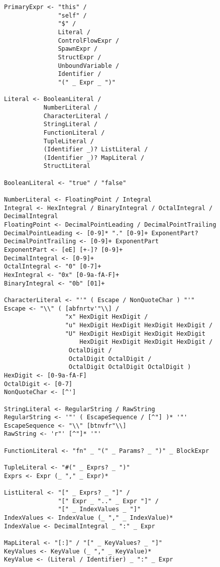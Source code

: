 \begin{verbatim}
PrimaryExpr <- "this" /
               "self" /
               "$" /
               Literal /
               ControlFlowExpr /
               SpawnExpr /
               StructExpr /
               UnboundVariable /
               Identifier /
               "(" _ Expr _ ")"

Literal <- BooleanLiteral /
           NumberLiteral /
           CharacterLiteral /
           StringLiteral /
           FunctionLiteral /
           TupleLiteral /
           (Identifier _)? ListLiteral /
           (Identifier _)? MapLiteral /
           StructLiteral

BooleanLiteral <- "true" / "false"

NumberLiteral <- FloatingPoint / Integral
Integral <- HexIntegral / BinaryIntegral / OctalIntegral / DecimalIntegral
FloatingPoint <- DecimalPointLeading / DecimalPointTrailing
DecimalPointLeading <- [0-9]* "." [0-9]+ ExponentPart?
DecimalPointTrailing <- [0-9]+ ExponentPart
ExponentPart <- [eE] [+-]? [0-9]+
DecimalIntegral <- [0-9]+
OctalIntegral <- "0" [0-7]+
HexIntegral <- "0x" [0-9a-fA-F]+
BinaryIntegral <- "0b" [01]+

CharacterLiteral <- "'" ( Escape / NonQuoteChar ) "'"
Escape <- "\\" ( [abfnrtv'"\\] /
                 "x" HexDigit HexDigit /
                 "u" HexDigit HexDigit HexDigit HexDigit /
                 "U" HexDigit HexDigit HexDigit HexDigit
                     HexDigit HexDigit HexDigit HexDigit /
                  OctalDigit /
                  OctalDigit OctalDigit /
                  OctalDigit OctalDigit OctalDigit )
HexDigit <- [0-9a-fA-F]
OctalDigit <- [0-7]
NonQuoteChar <- [^']

StringLiteral <- RegularString / RawString
RegularString <- '"' ( EscapeSequence / [^"] )* '"'
EscapeSequence <- "\\" [btnvfr"\\]
RawString <- 'r"' [^"]* '"'

FunctionLiteral <- "fn" _ "(" _ Params? _ ")" _ BlockExpr

TupleLiteral <- "#(" _ Exprs? _ ")"
Exprs <- Expr (_ "," _ Expr)*

ListLiteral <- "[" _ Exprs? _ "]" /
               "[" Expr _ ".." _ Expr "]" /
               "[" _ IndexValues _ "]"
IndexValues <- IndexValue (_ "," _ IndexValue)*
IndexValue <- DecimalIntegral _ ":" _ Expr

MapLiteral <- "[:]" / "[" _ KeyValues? _ "]"
KeyValues <- KeyValue (_ "," _ KeyValue)*
KeyValue <- (Literal / Identifier) _ ":" _ Expr


\end{verbatim}

